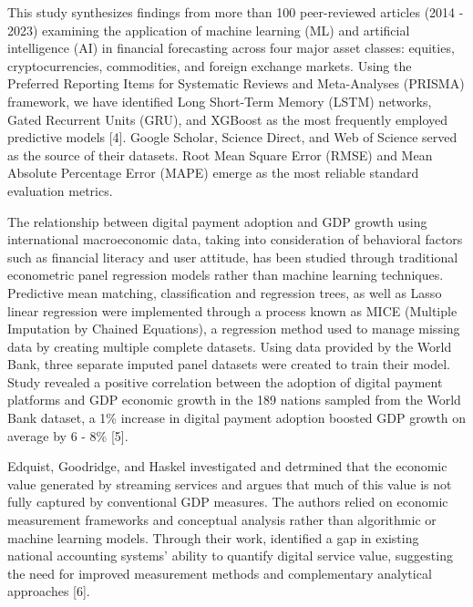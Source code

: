 \documentclass[12pt]{article}
\begin{document}
        
        This study synthesizes findings from more than 100 peer-reviewed articles (2014 - 2023) examining the application of machine learning (ML) and artificial intelligence (AI) in financial forecasting across four major asset classes: equities, cryptocurrencies, commodities, and foreign exchange markets. Using the Preferred Reporting Items for Systematic Reviews and Meta-Analyses (PRISMA) framework, we have identified Long Short-Term Memory (LSTM) networks, Gated Recurrent Units (GRU), and XGBoost as the most frequently employed predictive models [4]. Google Scholar, Science Direct, and Web of Science served as the source of their datasets. Root Mean Square Error (RMSE) and Mean Absolute Percentage Error (MAPE) emerge as the most reliable standard evaluation metrics. 

        The relationship between digital payment adoption and GDP growth using international macroeconomic data, taking into consideration of behavioral factors such as financial literacy and user attitude, has been studied through traditional econometric panel regression models rather than machine learning techniques. Predictive mean matching, classification and regression trees, as well as Lasso linear regression were implemented through a process known as MICE (Multiple Imputation by Chained Equations), a regression method used to manage missing data by creating multiple complete datasets. Using data provided by the World Bank, three separate imputed panel datasets were created to train their model. Study revealed a positive correlation between the adoption of digital payment platforms and GDP economic growth in the 189 nations sampled from the World Bank dataset, a 1\% increase in digital payment adoption boosted GDP growth on average by 6 - 8\% [5].

        Edquist, Goodridge, and Haskel investigated and detrmined that the economic value generated by streaming services and argues that much of this value is not fully captured by conventional GDP measures. The authors relied on economic measurement frameworks and conceptual analysis rather than algorithmic or machine learning models. Through their work, identified a gap in existing national accounting systems’ ability to quantify digital service value, suggesting the need for improved measurement methods and complementary analytical approaches [6].
\end{document}
